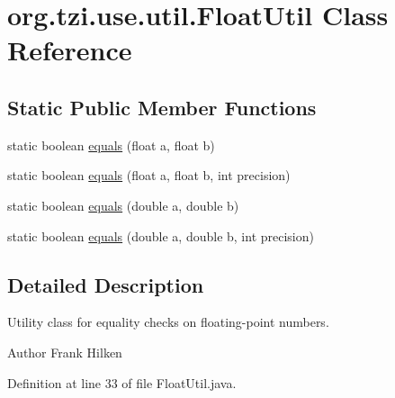 \hypertarget{classorg_1_1tzi_1_1use_1_1util_1_1_float_util}{\section{org.\-tzi.\-use.\-util.\-Float\-Util Class Reference}
\label{classorg_1_1tzi_1_1use_1_1util_1_1_float_util}
}
\subsection*{Static Public Member Functions}
\begin{DoxyCompactItemize}
\item 
static boolean \hyperlink{classorg_1_1tzi_1_1use_1_1util_1_1_float_util_a4a7993bd88475fbf5434c3c78a41c8d5}{equals} (float a, float b)
\item 
static boolean \hyperlink{classorg_1_1tzi_1_1use_1_1util_1_1_float_util_ae9e9167383f9b52e0e3040cd42d66d1e}{equals} (float a, float b, int precision)
\item 
static boolean \hyperlink{classorg_1_1tzi_1_1use_1_1util_1_1_float_util_a16d6e60b8d0cda30c0aabe1bd1947ce5}{equals} (double a, double b)
\item 
static boolean \hyperlink{classorg_1_1tzi_1_1use_1_1util_1_1_float_util_a33e8a95fd444e869dce81250f1fa5d23}{equals} (double a, double b, int precision)
\end{DoxyCompactItemize}


\subsection{Detailed Description}
Utility class for equality checks on floating-\/point numbers.

\begin{DoxyAuthor}{Author}
Frank Hilken 
\end{DoxyAuthor}


Definition at line 33 of file Float\-Util.\-java.



